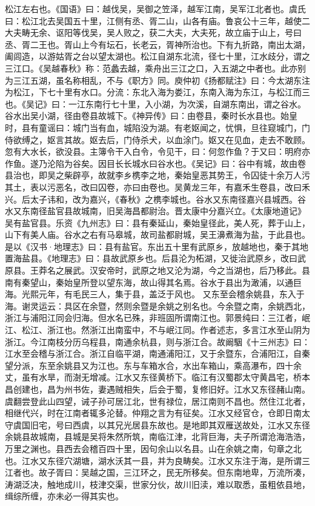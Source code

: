 \documentclass[12pt,UTF8]{ctexbook}
\begin{document}
松江左右也。《国语》曰：越伐吴，吴御之笠泽，越军江南，吴军江北者也。虞氏曰：松江北去吴国五十里，江侧有丞、胥二山，山各有庙。鲁哀公十三年，越使二大夫畴无余、讴阳等伐吴，吴人败之，获二大夫，大夫死，故立庙于山上，号曰丞、胥二王也。胥山上今有坛石，长老云，胥神所治也。下有九折路，南出太湖，阖闾造，以游姑胥之台以望太湖也。松江自湖东北流，径七十里，江水歧分，谓之三江口。《吴越春秋》称：范蠡去越，乘舟出三江之口，入五湖之中者也。此亦别为三江五湖，虽名称相乱，不与《职方》同。庾仲初《扬都赋注》曰：今太湖东注为松江，下七十里有水口。分流：东北入海为娄江，东南入海为东江，与松江而三也。《吴记》曰：一江东南行七十里，入小湖，为次溪，自湖东南出，谓之谷水。谷水出吴小湖，径由卷县故城下。《神异传》曰：由卷县，秦时长水县也。始皇时，县有童谣曰：城门当有血，城陷没为湖。有老妪闻之，忧惧，旦往窥城门，门侍欲缚之，妪言其故。妪去后，门侍杀犬，以血涂门。妪又在见血，走去不敢顾。忽有大水长，欲没县。主簿令干入白令，令见干，曰：何忽作鱼？于又曰：明府亦作鱼。遂乃沦陷为谷矣。因目长长城水曰谷水也。《吴记》曰：谷中有城，故由卷县治也，即吴之柴辟亭，故就李乡槜李之地，秦始皇恶其势王，令囚徒十余万人污其土，表以污恶名，改曰囚卷，亦曰由卷也。吴黄龙三年，有嘉禾生卷县，改曰禾兴。后太子讳和，改为嘉兴，《春秋》之槜李城也。谷水又东南径嘉兴县城西。谷水又东南径盐官县故城南，旧吴海昌都尉治。晋太康中分嘉兴立。《太康地道记》吴有盐官县。乐资《九州志》曰：县有秦延山，秦始皇径此，美人死，葬于山上，山下有美人庙。谷水之右有马皋城，故司盐都尉城，吴王濞煮海为盐，于此县也。是以《汉书·地理志》曰：县有盐官。东出五十里有武原乡，放越地也，秦于其地置海盐县。《地理志》曰：县故武原乡也。后县沦为柘湖，又徙治武原乡，改曰武原县。王莽名之展武。汉安帝时，武原之地又沦为湖，今之当湖也，后乃移此。县南有秦望山，秦始皇所登以望东海，故山得其名焉。谷水于县出为澉浦，以通巨海。光熙元年，有毛民三人，集于县，盖泛于风也。
又东至会稽余姚县，东入于海。谢灵运云：具区在余暨，然则余暨是余姚之别名也。今余暨之南，余姚西北，浙江与浦阳江同会归海。但水名已殊，非班固所谓南江也。郭景纯曰：三江者，岷江、松江、浙江也。然浙江出南蛮中，不与岷江同。作者述志，多言江水至山阴为浙江。今江南枝分历乌程县，南通余杭县，则与浙江合。故阚駰《十三州志》曰：江水至会稽与浙江合。浙江自临平湖，南通浦阳江，又于余暨东，合浦阳江，自秦望分派，东至余姚县又为江也。东与车箱水合，水出车箱山，乘高瀑布，四十余丈，虽有水旱，而澍无增减。江水又东径黄桥下。临江有汉蜀郡太守黄昌宅，桥本昌创建也，昌为州书佐，妻遇贼相失，后会于蜀，复修旧好。江水又东径赭山南。虞翻尝登此山四望，诫子孙可居江北，世有禄位，居江南则不昌也。然住江北者，相继代兴，时在江南者辄多沦替。仲翔之言为有征矣。江水又经官仓，仓即日南太守虞国旧宅，号曰西虞，以其兄光居县东故也。是地即其双雁送故处，江水又东径余姚县故城南，县城是吴将朱然所筑，南临江津，北背巨海，夫子所谓沧海浩浩，万里之渊也。县西去会稽百四十里，因句余山以名县。山在余姚之南，句章之北也。江水又东径穴湖塘，湖水沃其一县，并为良畴矣。江水又东注于海，是所谓三江者也。故子胥曰：吴越之国，三江环之，民无所移矣。但东南地卑，万流所凑，涛湖泛决，触地成川，枝津交渠，世家分伙，故川旧渎，难以取悉，虽粗依县地，缉综所缠，亦未必一得其实也。
\end{document}
